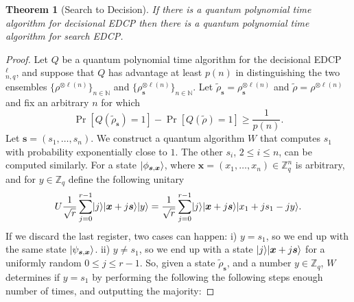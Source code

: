 \documentclass[11pt]{article}
\theoremstyle{plain}
\newtheorem{theorem}{Theorem}
\theoremstyle{definition}
\DeclarePairedDelimiter{\ldbrac}{\lvert}{\rangle}
\def\N{\ensuremath{\mathbb{N}}}
\def\Z{\ensuremath{\mathbb{Z}}}
\begin{document}
\begin{theorem}[Search to Decision]
    If there is a quantum polynomial time algorithm for decisional EDCP then there is a quantum polynomial time algorithm for search EDCP.
\end{theorem}
\begin{proof}
    Let $Q$ be a quantum polynomial time algorithm for the decisional EDCP$_{n, q}^\ell$, and suppose that $Q$ has advantage at least $p(n)$ in distinguishing the two ensembles $\{ \rho^{\otimes \ell(n)} \}_{n \in \N}$ and $\{ \rho_{\bm{s}}^{\otimes \ell(n)} \}_{n \in \N}$. Let $\tilde{\rho}_{\bm{s}} = \rho_{\bm{s}}^{\otimes \ell(n)}$ and $\tilde{\rho} = \rho^{\otimes \ell(n)}$ and fix an arbitrary $n$ for which
    \[ \Pr[ Q(\tilde{\rho}_{\bm{s}}) = 1 ] - \Pr[ Q(\tilde{\rho}) = 1 ] \ge \frac{1}{p(n)}. \]
    Let $\bm{s} = (s_1, \dots, s_n)$. We construct a quantum algorithm $W$ that computes $s_1$ with probability exponentially close to $1$. The other $s_i$, $2 \le i \le n$, can be computed similarly. For a state $\ldbrac{\phi_{\bm{s}, \bm{x}}}$, where $\bm{x} = (x_1, \dots, x_n) \in \Z_q^n$ is arbitrary, and for $y \in \Z_q$ define the following unitary
    \[
    U \frac{1}{\sqrt{r}} \sum_{j = 0}^{r - 1}\ldbrac{j}\ldbrac{\bm{x} + j\bm{s}} \ldbrac{y} = \frac{1}{\sqrt{r}} \sum_{j = 0}^{r - 1}\ldbrac{j}\ldbrac{\bm{x} + j\bm{s}} \ldbrac{x_1 + js_1 - jy}.
    \]
    If we discard the last register, two cases can happen: i) $y = s_1$, so we end up with the same state $\ldbrac{\psi_{\bm{s}, \bm{x}}}$. ii) $y \ne s_1$, so we end up with a state $\ldbrac{j} \ldbrac{\bm{x} + j\bm{s}}$ for a uniformly random $0 \le j \le r - 1$. So, given a state $\tilde{\rho}_{\bm{s}}$, and a number $y \in \Z_q$, $W$ determines if $y = s_1$ by performing the following the following steps enough number of times, and outputting the majority:
    

\end{proof}
\end{document}
